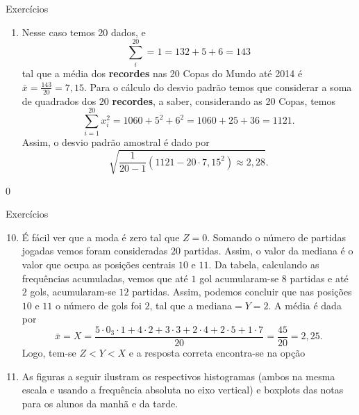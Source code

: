 {{{\begin{answer}{Exercícios}
{\begin{enumerate}
\begin{enumerate}
  Comparando a média aproximada de $7{,}5$ com a média $7{,}33$, conclui-se que o erro de aproximação é bem pequeno, representando apenas cerca de $2{,}3$\% da média obtida com a soma exata $\frac{|7{,}5-7{,}33|}{7{,}33}\approx0{,}023$. Comparando o desvio padrão aproximado de $2{,}25$ com o desvio padrão 2{,}33, conclui-se que o erro de aproximação é bem pequeno, representando apenas cerca de $3{,}4\%$ o desvio padrão obtido com as sobas exatas $\frac{|2{,}25-2{,}33|}{2{,}33}\approx0{,}034$.
  \item Nesse caso temos 20 dados, e
  \begin{equation*}
  \sum^{20}_i=1=132+5+6=143
  \end{equation*}
  tal que a média dos \textbf{recordes} nas 20 Copas do Mundo até 2014 
  é $\bar{x}=\frac{143}{20}=7{,}15$. Para o cálculo do desvio padrão temos que considerar a soma de quadrados dos 20 \textbf{recordes}, a saber, considerando as 20 Copas, temos
  \begin{equation*}
  \sum^{20}_{i=1}x^2_i=1060+5^2+6^2=1060+25+36=1121.
  \end{equation*}
  Assim, o desvio padrão amostral é dado por
  \begin{equation*}
  \sqrt{\frac{1}{20-1}(1121-20\cdot7{,}15^2)\approx2{,}28}.
  \end{equation*}
  \end{enumerate}
  \end{enumerate}
}{0}
\end{answer}
\clearmargin

\begin{answer}{Exercícios}
{\exerciselist
  \begin{enumerate}\setcounter{enumi}{9}
  \item É fácil ver que a moda é zero tal que $Z=0$. Somando o número de partidas jogadas vemos foram consideradas $20$ partidas. Assim, o valor da mediana é o valor que ocupa as posições centrais $10$ e $11$. Da tabela, calculando as frequências acumuladas, vemos que até $1$ gol acumularam-se $8$ partidas e até $2$ gols, acumularam-se $12$ partidas. Assim, podemos concluir que nas posições $10$ e $11$ o número de gols foi $2$, tal que a mediana$=Y=2$. A média é dada por
  \begin{equation*}
  \bar{x}=X=\frac{5\cdot0_3\cdot1+4\cdot2+3\cdot3+2\cdot4+2\cdot5+1\cdot7}{20}=\frac{45}{20}=2{,}25.
  \end{equation*}
  Logo, tem-se $Z<Y<X$ e a resposta correta encontra-se na opção 
  \item As figuras a seguir ilustram os respectivos histogramas (ambos na mesma escala e usando a frequência absoluta no eixo vertical) e boxplots das notas para os alunos da manhã e da tarde.
  \end{enumerate}
\begin{multicols}{2}
    \begin{figure}[H]
  \centering
  

\end{figure}
\end{multicols}}
\end{answer}}}}
